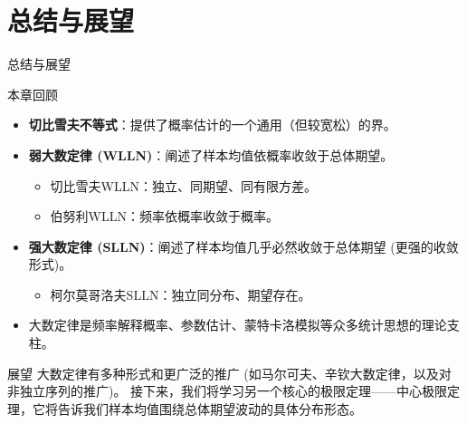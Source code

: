 \documentclass[UTF8]{beamer} %
\begin{document}
\section{总结与展望}
\begin{frame}{总结与展望}
    \begin{block}{本章回顾}
    \begin{itemize}
        \item \textbf{切比雪夫不等式}：提供了概率估计的一个通用（但较宽松）的界。
        \item \textbf{弱大数定律 (WLLN)}：阐述了样本均值依概率收敛于总体期望。
            \begin{itemize}
                \item 切比雪夫WLLN：独立、同期望、同有限方差。
                \item 伯努利WLLN：频率依概率收敛于概率。
            \end{itemize}
        \item \textbf{强大数定律 (SLLN)}：阐述了样本均值几乎必然收敛于总体期望 (更强的收敛形式)。
            \begin{itemize}
                \item 柯尔莫哥洛夫SLLN：独立同分布、期望存在。
            \end{itemize}
        \item 大数定律是频率解释概率、参数估计、蒙特卡洛模拟等众多统计思想的\alert{理论支柱}。
    \end{itemize}
    \end{block}
    \pause
    \begin{alertblock}{展望}
        大数定律有多种形式和更广泛的推广 (如马尔可夫、辛钦大数定律，以及对非独立序列的推广)。
        接下来，我们将学习另一个核心的极限定理——\alert{中心极限定理}，它将告诉我们样本均值围绕总体期望波动的具体分布形态。
    \end{alertblock}
\end{frame}
\end{document}
